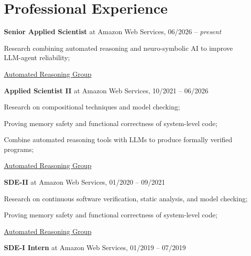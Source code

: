 \documentclass[letterpaper]{article}
\renewenvironment{itemize}{
  \begin{list}{}{
    \setlength{\leftmargin}{1.5em}
  }
}{
  \end{list}
}
\begin{document}
\section*{Professional Experience}

    \begin{enumerate}
      \item{{\bf Senior Applied Scientist} at Amazon Web Services, 06/2026 -- {\it present}}
      \begin{itemize}
        \item{\textendash} {Research combining automated reasoning and neuro-symbolic AI to improve LLM-agent reliability;}
        \item{\textendash} \href{https://aws.amazon.com/security/provable-security/}{Automated Reasoning Group}
      \end{itemize}
      \item{{\bf Applied Scientist II} at Amazon Web Services, 10/2021 -- 06/2026}
      \begin{itemize}
        \item{\textendash} {Research on compositional techniques and model checking;}
        \item{\textendash} {Proving memory safety and functional correctness of system-level code;}
        \item{\textendash} {Combine automated reasoning tools with LLMs to produce formally verified programs;}
        \item{\textendash} \href{https://aws.amazon.com/security/provable-security/}{Automated Reasoning Group}
      \end{itemize}
      \item{{\bf SDE-II} at Amazon Web Services, 01/2020 -- 09/2021}
      \begin{itemize}
        \item{\textendash} {Research on continuous software verification, static analysis, and model checking;}
        \item{\textendash} {Proving memory safety and functional correctness of system-level code;}
        \item{\textendash} \href{https://aws.amazon.com/security/provable-security/?sc_channel=EL&sc_campaign=Promo_2018_vid&sc_medium=YouTube&sc_content=video3507&sc_detail=CAREERS&sc_country=US}{Automated Reasoning Group}
      \end{itemize}
     \item{{\bf SDE-I Intern} at Amazon Web Services, 01/2019 -- 07/2019}
      \begin{itemize}

\end{itemize}
\end{enumerate}
\end{document}
